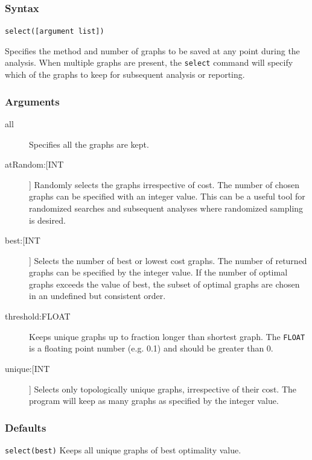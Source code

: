 	\subsubsection{Syntax}
		\texttt{select([argument list])}
	
	\begin{phygdescription}
		{Specifies the method and number of graphs to be saved at any point during the 
		analysis. When multiple graphs are present, the \texttt{select} command will specify 
		which of the graphs to keep for subsequent analysis or reporting.}
	\end{phygdescription}
				
	\subsubsection{Arguments}
		\begin{description}
			\item[all] Specifies all the graphs are kept.
		
			\item[atRandom:[INT]] Randomly selects the graphs irrespective of cost. The 
			number of chosen graphs can be specified with an integer value. This can 
			be a useful tool for randomized searches and subsequent analyses where 
			randomized sampling is desired.
			
			\item[best:[INT]] Selects the number of best or lowest cost graphs. The 
			number of returned graphs can be specified by the integer value. If the number 
			of optimal graphs exceeds the value of best, the subset of optimal graphs are chosen 
			in an undefined but consistent order.
							
			\item[threshold:FLOAT] Keeps unique graphs up to fraction longer than shortest 
			graph. The \texttt{FLOAT} is a floating point number (e.g. 0.1) and should be 
			greater than 0.
			
			\item[unique:[INT]] Selects only topologically unique graphs, irrespective of their
			cost. The program will keep as many graphs as specified by the integer value.
		\end{description}

	\subsubsection{Defaults}
		\texttt{select(best)} Keeps all unique graphs of best optimality value.
		
